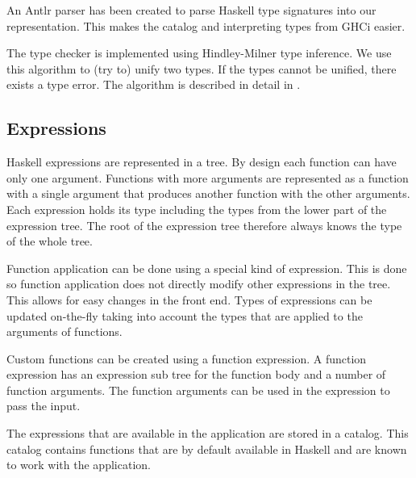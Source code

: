 An Antlr parser has been created to parse Haskell type signatures into our representation. This makes the catalog and interpreting types from GHCi easier.

The type checker is implemented using Hindley-Milner type inference. We use this algorithm to (try to) unify two
types. If the types cannot be unified, there exists a type error. The algorithm is described in detail in
\cite{borisov}.  

\subsection{Expressions}

Haskell expressions are represented in a tree.
By design each function can have only one argument.
Functions with more arguments are represented as a function with a single argument that produces another function with the other arguments.
Each expression holds its type including the types from the lower part of the expression tree. The root of the
expression tree therefore always knows the type of the whole tree.

Function application can be done using a special kind of expression.
This is done so function application does not directly modify other expressions in the tree.
This allows for easy changes in the front end.
Types of expressions can be updated on-the-fly taking into account the types that are applied to the arguments of functions.

Custom functions can be created using a function expression.
A function expression has an expression sub tree for the function body and a number of function arguments.
The function arguments can be used in the expression to pass the input.

The expressions that are available in the application are stored in a catalog. This catalog contains functions that are
by default available in Haskell and are known to work with the application.
